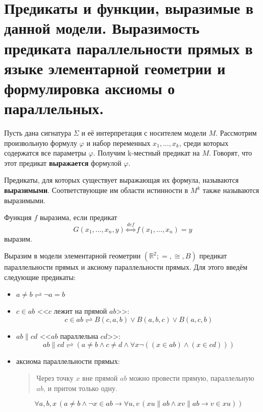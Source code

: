 \section{Предикаты и функции, выразимые в данной модели. Выразимость предиката параллельности прямых в языке
элементарной геометрии и формулировка аксиомы о параллельных.}
\begin{definition}
	Пусть дана сигнатура $\Sigma$ и её интерпретация с носителем модели $M$. Рассмотрим произвольную формулу
	$\varphi$ и набор переменных $x_1,\ldots,x_k$, среди которых содержатся все параметры $\varphi$. Получим k-местный
	предикат на $M$. Говорят, что этот предикат \textbf{выражается} формулой $\varphi$.

	Предикаты, для которых существует выражающая их формула, называются \textbf{выразимыми}. Соответствующие им
	области истинности в $M^k$ также называются выразимыми.
\end{definition}
\begin{definition}
	Функция $f$ выразима, если предикат $$G(x_1,\ldots,x_n,y) \stackrel{def}{\Longleftrightarrow} f(x_1,\ldots,x_n)
	= y$$ выразим.
\end{definition}
\begin{example}
	Выразим в модели элементарной геометрии $(\mathbb{R}^2;=,\cong,B)$ предикат параллельности прямых и аксиому
	параллельности прямых. Для этого введём следующие предикаты:
	\begin{itemize}
		\item $a \ne b \rightleftharpoons \neg a=b$
		\item $c \in ab$ <<$c$ лежит на прямой $ab$>>: $$c\in ab \rightleftharpoons B(c,a,b)\vee B(a,b,c)\vee
			B(a,c,b)$$
		\item $ab\parallel cd$ <<$ab$ параллельна $cd$>>: $$ab\parallel cd\rightleftharpoons (a \ne b\wedge c \ne
			d\wedge \forall x\neg ((x\in ab)\wedge (x\in cd)))$$
		\item аксиома параллельности прямых:
			\begin{quote}
				Через точку $x$ вне прямой $ab$ можно провести прямую, параллельную $ab$, и притом только одну.
			\end{quote}
			$$\forall a,b,x\,(a\ne b \wedge\neg x\in ab \to \forall u,v\,(xu\parallel ab \wedge xv\parallel ab\to
			v\in xu))$$
	\end{itemize}
\end{example}
